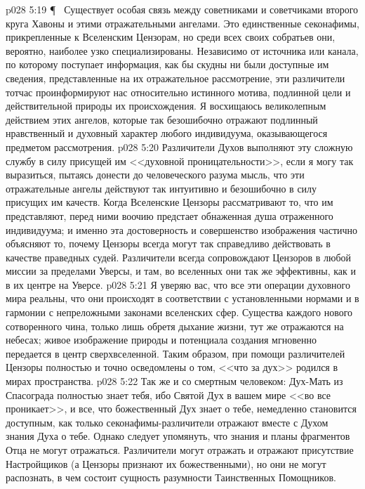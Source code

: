 \vs p028 5:19 \P\ \bibnobreakspace {} Существует особая связь между советниками и советчиками второго круга Хавоны и этими отражательными ангелами. Это единственные секонафимы, прикрепленные к Вселенским Цензорам, но среди всех своих собратьев они, вероятно, наиболее узко специализированы. Независимо от источника или канала, по которому поступает информация, как бы скудны ни были доступные им сведения, представленные на их отражательное рассмотрение, эти различители тотчас проинформируют нас относительно истинного мотива, подлинной цели и действительной природы их происхождения. Я восхищаюсь великолепным действием этих ангелов, которые так безошибочно отражают подлинный нравственный и духовный характер любого индивидуума, оказывающегося предметом рассмотрения.
\vs p028 5:20 Различители Духов выполняют эту сложную службу в силу присущей им <<духовной проницательности>>, если я могу так выразиться, пытаясь донести до человеческого разума мысль, что эти отражательные ангелы действуют так интуитивно и безошибочно в силу присущих им качеств. Когда Вселенские Цензоры рассматривают то, что им представляют, перед ними воочию предстает обнаженная душа отраженного индивидуума; и именно эта достоверность и совершенство изображения частично объясняют то, почему Цензоры всегда могут так справедливо действовать в качестве праведных судей. Различители всегда сопровождают Цензоров в любой миссии за пределами Уверсы, и там, во вселенных они так же эффективны, как и в их центре на Уверсе.
\vs p028 5:21 Я уверяю вас, что все эти операции духовного мира реальны, что они происходят в соответствии с установленными нормами и в гармонии с непреложными законами вселенских сфер. Существа каждого нового сотворенного чина, только лишь обретя дыхание жизни, тут же отражаются на небесах; живое изображение природы и потенциала создания мгновенно передается в центр сверхвселенной. Таким образом, при помощи различителей Цензоры полностью и точно осведомлены о том, <<что за дух>> родился в мирах пространства.
\vs p028 5:22 Так же и со смертным человеком: Дух\hyp{}Мать из Спасограда полностью знает тебя, ибо Святой Дух в вашем мире <<во все проникает>>, и все, что божественный Дух знает о тебе, немедленно становится доступным, как только секонафимы\hyp{}различители отражают вместе с Духом знания Духа о тебе. Однако следует упомянуть, что знания и планы фрагментов Отца не могут отражаться. Различители могут отражать и отражают присутствие Настройщиков (а Цензоры признают их божественными), но они не могут распознать, в чем состоит сущность разумности Таинственных Помощников.
